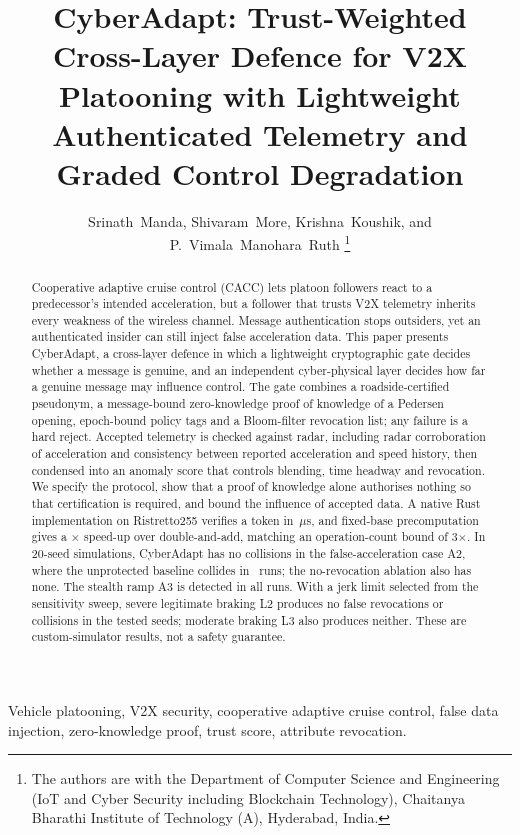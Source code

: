 \documentclass[journal]{IEEEtran}
\begin{document}
\title{CyberAdapt: Trust-Weighted Cross-Layer Defence for V2X Platooning with Lightweight Authenticated Telemetry and Graded Control Degradation}
\author{Srinath~Manda, Shivaram~More, Krishna~Koushik, and P.~Vimala~Manohara~Ruth
\thanks{The authors are with the Department of Computer Science and Engineering (IoT and Cyber Security including Blockchain Technology), Chaitanya Bharathi Institute of Technology (A), Hyderabad, India.}}
\maketitle

\begin{abstract}
Cooperative adaptive cruise control (CACC) lets platoon followers react to a predecessor's intended acceleration, but a follower that trusts V2X telemetry inherits every weakness of the wireless channel. Message authentication stops outsiders, yet an authenticated insider can still inject false acceleration data. This paper presents CyberAdapt, a cross-layer defence in which a lightweight cryptographic gate decides whether a message is genuine, and an independent cyber-physical layer decides how far a genuine message may influence control. The gate combines a roadside-certified pseudonym, a message-bound zero-knowledge proof of knowledge of a Pedersen opening, epoch-bound policy tags and a Bloom-filter revocation list; any failure is a hard reject. Accepted telemetry is checked against radar, including radar corroboration of acceleration and consistency between reported acceleration and speed history, then condensed into an anomaly score that controls blending, time headway and revocation. We specify the protocol, show that a proof of knowledge alone authorises nothing so that certification is required, and bound the influence of accepted data. A native Rust implementation on Ristretto255 verifies a token in \natZkVerifyUs\,$\mu$s, and fixed-base precomputation gives a \natSpeedupSmbp$\times$ speed-up over double-and-add, matching an operation-count bound of 3$\times$. In 20-seed simulations, CyberAdapt has no collisions in the false-acceleration case A2, where the unprotected baseline collides in \collAtwoDzero\ runs; the no-revocation ablation also has none. The stealth ramp A3 is detected in all runs. With a jerk limit selected from the sensitivity sweep, severe legitimate braking L2 produces no false revocations or collisions in the tested seeds; moderate braking L3 also produces neither. These are custom-simulator results, not a safety guarantee.
\end{abstract}
\begin{IEEEkeywords}
Vehicle platooning, V2X security, cooperative adaptive cruise control, false data injection, zero-knowledge proof, trust score, attribute revocation.
\end{IEEEkeywords}
\end{document}
